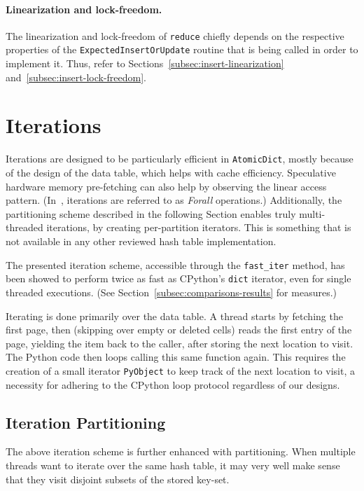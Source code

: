\paragraph{Linearization and lock-freedom.}
The linearization and lock-freedom of \texttt{reduce} chiefly depends on the respective properties of the \texttt{ExpectedInsertOr\-Update} routine that is being called in order to implement it.
Thus, refer to Sections~\ref{subsec:insert-linearization} and~\ref{subsec:insert-lock-freedom}.


\section{Iterations}\label{sec:iterations}

Iterations are designed to be particularly efficient in \texttt{AtomicDict}, mostly because of the design of the data table, which helps with cache efficiency.
Speculative hardware memory pre-fetching can also help by observing the linear access pattern.
(In~\cite{maier}, iterations are referred to as \emph{Forall} operations.)
Additionally, the partitioning scheme described in the following Section enables truly multi-threaded iterations, by creating per-partition iterators.
This is something that is not available in any other reviewed hash table implementation.

The presented iteration scheme, accessible through the \texttt{{fast\_iter}} method, has been showed to perform twice as fast as CPython's \texttt{dict} iterator, even for single threaded executions.
(See Section~\ref{subsec:comparisons-results} for measures.)

Iterating is done primarily over the data table.
A thread starts by fetching the first page, then (skipping over empty or deleted cells) reads the first entry of the page, yielding the item back to the caller, after storing the next location to visit.
The Python code then loops calling this same function again.
This requires the creation of a small iterator \texttt{PyObject} to keep track of the next location to visit, a necessity for adhering to the CPython loop protocol regardless of our designs.

\subsection{Iteration Partitioning}\label{subsec:iteration-partitioning}

The above iteration scheme is further enhanced with partitioning.
When multiple threads want to iterate over the same hash table, it may very well make sense that they visit disjoint subsets of the stored key-set.

